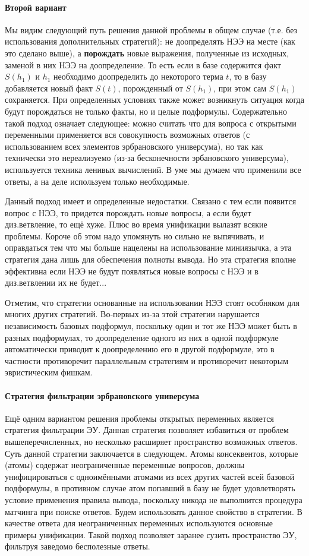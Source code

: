 \paragraph{Второй вариант}
Мы видим следующий путь решения данной проблемы в общем случае (т.е. без использования дополнительных стратегий): не доопределять НЭЭ на месте (как это сделано выше), а \textbf{порождать} новые выражения, полученные из исходных, заменой в них НЭЭ на доопределение. То есть если в базе содержится факт $S(h_1)$ и $h_1$ необходимо доопределить до некоторого терма $t$, то в базу добавляется новый факт $S(t)$, порожденный от $S(h_1)$, при этом сам $S(h_1)$ сохраняется. При определенных условиях также может возникнуть ситуация когда будут порождаться не только факты, но и целые подформулы. 
Содержательно такой подход означает следующее: можно считать что для вопроса с открытыми переменными применяется вся совокупность возможных ответов (с использованием всех элементов эрбрановского универсума), но так как технически это нереализуемо (из-за бесконечности эрбановского универсума), используется техника ленивых вычислений. В уме мы думаем что применили все ответы, а на деле используем только необходимые. 

Данный подход имеет и определенные недостатки. Связано с тем если появится вопрос с НЭЭ, то придется порождать новые вопросы, а если будет диз.ветвление, то ещё хуже. Плюс во время унификации вылазят всякие проблемы. Короче об этом надо упомянуть но сильно не выпячивать, и оправдаться тем что мы больше нацелены на использование миниязычка, а эта стратегия дана лишь для обеспечения полноты вывода. Но эта стратегия вполне эффективна если НЭЭ не будут появляться новые вопросы с НЭЭ и в диз.ветвлении их не будет... 

Отметим, что стратегии основанные на использовании НЭЭ стоят особняком для многих других стратегий. Во-первых из-за этой стратегии нарушается независимость базовых подформул, поскольку один и тот же НЭЭ может быть в разных подформулах, то доопределение одного из них в одной подформуле автоматически приводит к доопределению его в другой подформуле, это в частности противоречит параллельным стратегиям и противоречит некоторым эвристическим фишкам.

\paragraph{Стратегия фильтрации эрбрановского универсума}
Ещё одним вариантом решения проблемы открытых переменных является стратегия фильтрации ЭУ. Данная стратегия позволяет избавиться от проблем вышеперечисленных, но несколько расширяет пространство возможных ответов. Суть данной стратегии заключается в следующем. Атомы консеквентов, которые (атомы) содержат неограниченные переменные вопросов, должны унифицироваться с одноимёнными атомами из всех других частей всей базовой подформулы, в противном случае атом попавший в базу не будет удовлетворять условие применения правила вывода, поскольку никода не выполнится процедура матчинга при поиске ответов. Будем использовать данное свойство в стратегии. В качестве ответа для неограниченных переменных используются основные примеры унификации. Такой подход позволяет заранее сузить пространство ЭУ, фильтруя заведомо бесполезные ответы.

